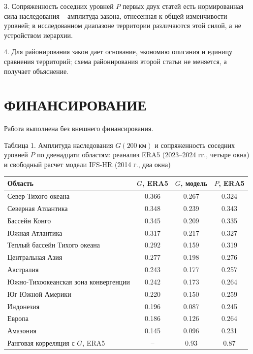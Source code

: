 \documentclass[12pt,a4paper]{article}
\begin{document}
3. Сопряженность соседних уровней $P$ первых двух статей есть нормированная сила наследования -- амплитуда закона, отнесенная к общей изменчивости уровней; в исследованном диапазоне территории различаются этой силой, а не устройством иерархии.

4. Для районирования закон дает основание, экономию описания и единицу сравнения территорий; схема районирования второй статьи не меняется, а получает объяснение.

\section{ФИНАНСИРОВАНИЕ}

Работа выполнена без внешнего финансирования.



\clearpage
\begin{singlespace}
\noindent Таблица 1. Амплитуда наследования $G(200~\text{км})$ и сопряженность соседних уровней $P$ по двенадцати областям: реанализ ERA5 (2023--2024 гг., четыре окна) и свободный расчет модели IFS-HR (2014 г., два окна)

\medskip
\noindent\begin{tabular}{@{}lccc@{}}
\toprule
Область & $G$, ERA5 & $G$, модель & $P$, ERA5\\
\midrule
Север Тихого океана & 0.366 & 0.267 & 0.324\\
Северная Атлантика & 0.348 & 0.239 & 0.343\\
Бассейн Конго & 0.345 & 0.209 & 0.335\\
Южная Атлантика & 0.317 & 0.217 & 0.327\\
Теплый бассейн Тихого океана & 0.292 & 0.159 & 0.319\\
Центральная Азия & 0.277 & 0.198 & 0.276\\
Австралия & 0.243 & 0.177 & 0.257\\
Южно-Тихоокеанская зона конвергенции & 0.242 & 0.173 & 0.264\\
Юг Южной Америки & 0.220 & 0.150 & 0.259\\
Индонезия & 0.196 & 0.087 & 0.245\\
Европа & 0.186 & 0.126 & 0.264\\
Амазония & 0.145 & 0.096 & 0.231\\
\midrule
Ранговая корреляция с $G$, ERA5 & -- & 0.93 & 0.87\\
\bottomrule
\end{tabular}
\end{singlespace}
\end{document}
